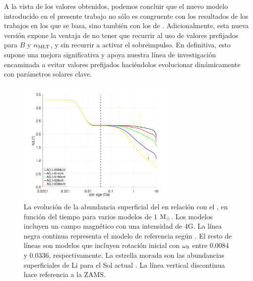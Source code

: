 A la vista de los valores obtenidos, podemos concluir que el nuevo modelo introducido en el presente trabajo no sólo es congruente con los resultados de los trabajos en los que se basa, sino también con los de \cite{Caballero2020}. Adicionalmente, esta nueva versión expone la ventaja de no tener que recurrir al uso de valores prefijados para $B$ y $\alpha_{\mathrm{MLT}}$, y sin recurrir a activar el sobreimpulso. En definitiva, esto supone una mejora significativa y apoya nuestra línea de investigación encaminada a evitar valores prefijados haciéndolos evolucionar dinámicamente con parámetros solares clave.\par

\begin{figure}
	\centering
	\includegraphics[width=0.7\textwidth]{img/paper2/li_var_vel_4_0g4.pdf}
	\caption{La evolución de la abundancia superficial del  en relación con el , en función del tiempo para varios modelos de 1 $\mathrm{M}_\odot$. Los modelos incluyen un campo magnético con una intensidad de 4G. La línea negra continua representa el modelo de referencia según \cite{Choi2016}. El resto de líneas son modelos que incluyen rotación inicial con $\omega_{\mathrm{0}}$ entre 0.0084 y 0.0336, respectivamente. La estrella morada son las abundancias superficiales de Li para el Sol actual \cite{Asplund2009}. La línea vertical discontinua hace referencia a la ZAMS.}
	\label{fig:li_var_vel_4_0g4}
\end{figure}

